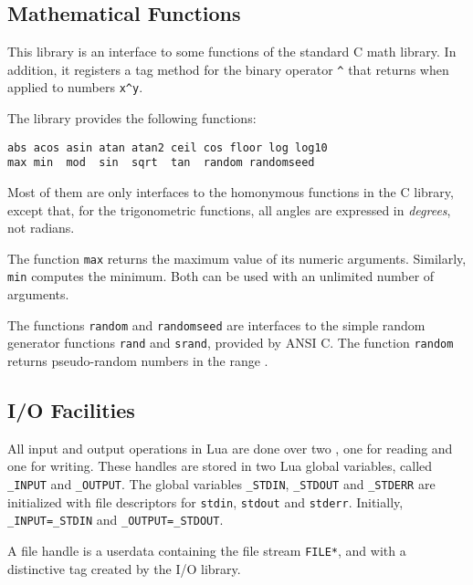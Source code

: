 \subsection{Mathematical Functions} \label{mathlib}

This library is an interface to some functions of the standard C math library.
In addition, it registers a tag method for the binary operator \verb|^| that
returns  when applied to numbers \verb|x^y|.

The library provides the following functions:
\begin{verbatim}
abs acos asin atan atan2 ceil cos floor log log10
max min  mod  sin  sqrt  tan  random randomseed
\end{verbatim}
Most of them
are only interfaces to the homonymous functions in the C library,
except that, for the trigonometric functions,
all angles are expressed in \emph{degrees}, not radians.

The function \verb|max| returns the maximum
value of its numeric arguments.
Similarly, \verb|min| computes the minimum.
Both can be used with an unlimited number of arguments.

The functions \verb|random| and \verb|randomseed| are interfaces to
the simple random generator functions \verb|rand| and \verb|srand|,
provided by ANSI C.
The function \verb|random| returns pseudo-random numbers in the
range \Math{[0,1)}.


\subsection{I/O Facilities} \label{libio}

All input and output operations in Lua are done over two
, one for reading and one for writing.
These handles are stored in two Lua global variables,
called \verb|_INPUT| and \verb|_OUTPUT|.
The global variables
\verb|_STDIN|, \verb|_STDOUT| and \verb|_STDERR|
are initialized with file descriptors for
\verb|stdin|, \verb|stdout| and \verb|stderr|.
Initially, \verb|_INPUT=_STDIN| and \verb|_OUTPUT=_STDOUT|.

A file handle is a userdata containing the file stream \verb|FILE*|,
and with a distinctive tag created by the I/O library.


